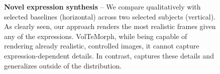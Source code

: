\begin{figure}[htb]
  \centering
  \resizebox{\linewidth}{!}{
    \versionone
  }
  \caption[Novel expression synthesis capabilities of \blendfields]{\textbf{Novel expression synthesis} --
    We compare qualitatively \blendfields with selected baselines (horizontal) across two selected subjects (vertical).
    As clearly seen, our approach renders the most realistic frames given any of
    the expressions.
    VolTeMorph, while being capable of rendering already realistic, controlled
    images, it cannot capture expression-dependent details.
    In contrast, \blendfields captures these details and generalizes outside of
    the distribution.
  }
  \label{fig:blendfields-qualitative-comparison}
\end{figure}